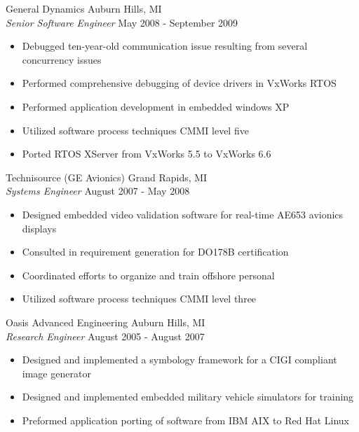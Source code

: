 \documentclass[line]{res}
\begin{document}
\begin{resume}
    \vspace{-2mm}
    General Dynamics \hfill Auburn Hills, MI\\
    {\sl Senior Software Engineer} \hfill May 2008 - September 2009
    \vspace{1mm}
    \begin{itemize}
       \item Debugged ten-year-old communication issue resulting from several concurrency issues
       \item Performed comprehensive debugging of device drivers in VxWorks RTOS
       \item Performed application development in embedded windows XP
       \item Utilized software process techniques CMMI level five
       \item Ported RTOS XServer from VxWorks 5.5 to VxWorks 6.6
    \end{itemize}

    \vspace{-2mm}
    Technisource (GE Avionics) \hfill Grand Rapids, MI\\
    {\sl Systems Engineer} \hfill August 2007 - May 2008
    \vspace{1mm}
    \begin{itemize}
      \item Designed embedded video validation software for real-time AE653 avionics displays
      \item Consulted in requirement generation for DO178B certification
      \item Coordinated efforts to organize and train offshore personal
      \item Utilized software process techniques CMMI level three
    \end{itemize}

    \vspace{-2mm}
    Oasis Advanced Engineering \hfill Auburn Hills, MI\\
    {\sl Research Engineer} \hfill August 2005 - August 2007
    \vspace{1mm}
    \begin{itemize}
      \item Designed and implemented a symbology framework for a CIGI compliant image generator
      \item Designed and implemented embedded military vehicle simulators for training
      \item Preformed application porting of software from IBM AIX to Red Hat Linux 
    \end{itemize}


\end{resume}
\end{document}
